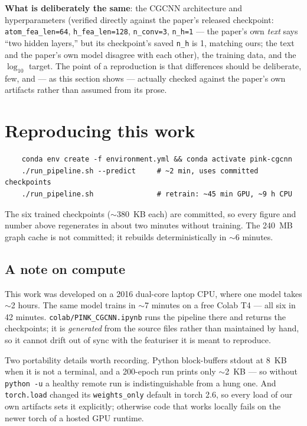 \documentclass[11pt,a4paper]{article}
\begin{document}
\noindent
\textbf{What is deliberately the same}: the CGCNN architecture and
hyperparameters (verified directly against the paper's released checkpoint:
\texttt{atom\_fea\_len=64}, \texttt{h\_fea\_len=128}, \texttt{n\_conv=3},
\texttt{n\_h=1} --- the paper's own \emph{text} says ``two hidden layers,''
but its checkpoint's saved \texttt{n\_h} is 1, matching ours; the text and the
paper's own model disagree with each other), the training data, and the
$\log_{10}$ target. The point of a reproduction is that differences should be
deliberate, few, and --- as this section shows --- actually checked against
the paper's own artifacts rather than assumed from its prose.

\section{Reproducing this work}

\begin{verbatim}
    conda env create -f environment.yml && conda activate pink-cgcnn
    ./run_pipeline.sh --predict     # ~2 min, uses committed checkpoints
    ./run_pipeline.sh               # retrain: ~45 min GPU, ~9 h CPU
\end{verbatim}

\noindent
The six trained checkpoints ($\sim$380~KB each) are committed, so every figure
and number above regenerates in about two minutes without training. The 240~MB
graph cache is not committed; it rebuilds deterministically in $\sim$6 minutes.

\subsection{A note on compute}

This work was developed on a 2016 dual-core laptop CPU, where one model takes
$\sim$2 hours. The same model trains in $\sim$7 minutes on a free Colab T4 ---
all six in 42 minutes. \texttt{colab/PINK\_CGCNN.ipynb} runs the pipeline there
and returns the checkpoints; it is \emph{generated} from the source files rather
than maintained by hand, so it cannot drift out of sync with the featuriser it
is meant to reproduce.

Two portability details worth recording. Python block-buffers stdout at 8~KB
when it is not a terminal, and a 200-epoch run prints only $\sim$2~KB --- so
without \texttt{python -u} a healthy remote run is indistinguishable from a hung
one. And \texttt{torch.load} changed its \texttt{weights\_only} default in torch
2.6, so every load of our own artifacts sets it explicitly; otherwise code that
works locally fails on the newer torch of a hosted GPU runtime.
\end{document}
